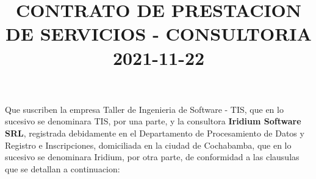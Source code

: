\documentclass[10pt,letterpaper]{article}
\title{ \textbf{CONTRATO DE PRESTACION DE SERVICIOS - CONSULTORIA }\\2021-11-22}\date{}
\begin{document}
\maketitle


Que suscriben la empresa Taller de Ingenieria de Software - TIS, que en lo sucesivo se denominara TIS, por
una parte, y la consultora \textbf{Iridium Software SRL}, registrada debidamente en el Departamento de Procesamiento de Datos y Registro e Inscripciones, domiciliada en la ciudad de Cochabamba, que en lo sucesivo se
denominara Iridium, por otra parte, de conformidad a las clausulas que se detallan a continuacion:
\end{document}
